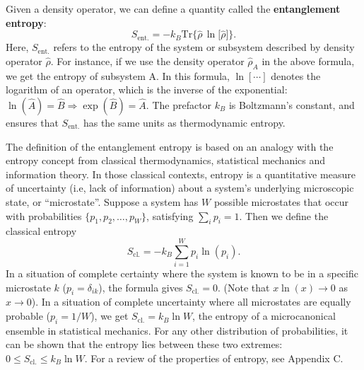 \documentclass[pra,12pt]{revtex4}
\begin{document}
Given a density operator, we can define a quantity called the
\textbf{entanglement entropy}:
$$S_{\mathrm{ent.}} = - k_B \mathrm{Tr} \Big\{ \hat{\rho}\, \ln\!\big[\hat{\rho}\big]\Big\}.$$
Here, $S_{\mathrm{ent.}}$ refers to the entropy of the system or
subsystem described by density operator $\hat{\rho}$.  For instance,
if we use the density operator $\hat{\rho}_A$ in the above formula, we
get the entropy of subsystem A.  In this formula, $\ln[\cdots]$
denotes the logarithm of an operator, which is the inverse of the
exponential: $\ln(\hat{A}) = \hat{B} \Rightarrow \exp(\hat{B}) =
\hat{A}$.  The prefactor $k_B$ is Boltzmann's constant, and ensures
that $S_{\mathrm{ent.}}$ has the same units as thermodynamic entropy.

The definition of the entanglement entropy is based on an analogy with
the entropy concept from classical thermodynamics, statistical
mechanics and information theory.  In those classical contexts,
entropy is a quantitative measure of uncertainty (i.e, lack of
information) about a system's underlying microscopic state, or
``microstate''.  Suppose a system has $W$ possible microstates that
occur with probabilities $\{p_1, p_2, \dots, p_W\}$, satisfying
$\sum_i p_i = 1$.  Then we define the classical entropy
$$S_{\mathrm{cl.}} = - k_B \sum_{i=1}^W p_i \ln(p_i).$$
In a situation of complete certainty where the system is known to be
in a specific microstate $k$ ($p_i = \delta_{ik}$), the formula gives
$S_{\mathrm{cl.}} = 0$.  (Note that $x \ln(x)\rightarrow 0$ as
$x\rightarrow 0$).  In a situation of complete uncertainty where all
microstates are equally probable ($p_i = 1/W$), we get
$S_{\mathrm{cl.}} = k_B \ln W$, the entropy of a microcanonical
ensemble in statistical mechanics.  For any other distribution of
probabilities, it can be shown that the entropy lies between these two
extremes: $0 \le S_{\mathrm{cl.}}  \le k_B\ln W$.  For a review of the
properties of entropy, see Appendix C.
\end{document}
